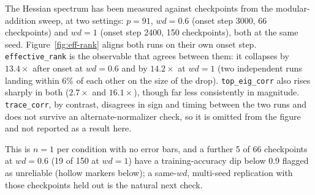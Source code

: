 \documentclass[11pt,a4paper]{article}
\begin{document}
The Hessian spectrum has been measured against checkpoints from the
modular-addition sweep, at two settings: $p=91$, $wd=0.6$ (onset step 3000, 66
checkpoints) and $wd=1$ (onset step 2400, 150 checkpoints), both at the same seed.
Figure~\ref{fig:eff-rank} aligns both runs on their own onset step.
\texttt{effective\_rank} is the observable that agrees between them: it
collapses by $13.4\times$ after onset at $wd=0.6$ and by $14.2\times$ at
$wd=1$ (two independent runs landing within 6\% of each other on the size
of the drop). \texttt{top\_eig\_corr} also rises sharply in both ($2.7\times$
and $16.1\times$), though far less consistently in magnitude.
\texttt{trace\_corr}, by contrast, disagrees in sign and timing between the
two runs and does not survive an alternate-normalizer check, so it is
omitted from the figure and not reported as a result here.

This is $n=1$ per condition with no error bars, and a further 5 of 66
checkpoints at $wd=0.6$ (19 of 150 at $wd=1$) have a training-accuracy dip
below 0.9 flagged as unreliable (hollow markers below); a same-$wd$,
multi-seed replication with those checkpoints held out is the natural next
check.

\newpage
\end{document}
